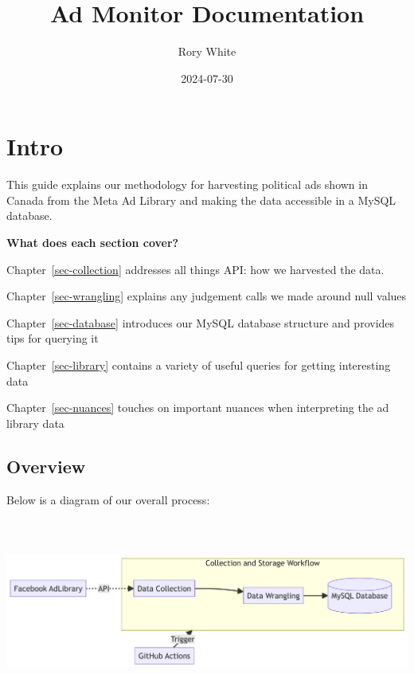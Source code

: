\documentclass[
  letterpaper,
  DIV=11,
  numbers=noendperiod]{scrreprt}
\title{Ad Monitor Documentation}
\author{Rory White}
\date{2024-07-30}
\renewcommand*\contentsname{Table of contents}
\newcommand\contentsname{Table of contents}
\begin{document}
\maketitle

\renewcommand*\contentsname{Table of contents}
{
\hypersetup{linkcolor=}
\setcounter{tocdepth}{2}
\tableofcontents
}

\chapter*{Intro}\label{intro}


This guide explains our methodology for harvesting political ads shown
in Canada from the Meta Ad Library and making the data accessible in a
MySQL database.

\textbf{What does each section cover?}

Chapter~\ref{sec-collection} addresses all things API: how we harvested
the data.

Chapter~\ref{sec-wrangling} explains any judgement calls we made around
null values

Chapter~\ref{sec-database} introduces our MySQL database structure and
provides tips for querying it

Chapter~\ref{sec-library} contains a variety of useful queries for
getting interesting data

Chapter~\ref{sec-nuances} touches on important nuances when interpreting
the ad library data

\section*{Overview}\label{overview}


Below is a diagram of our overall process:

\includegraphics[width=8.57in,height=2.41in]{index_files/figure-latex/mermaid-figure-1.png}
\end{document}
